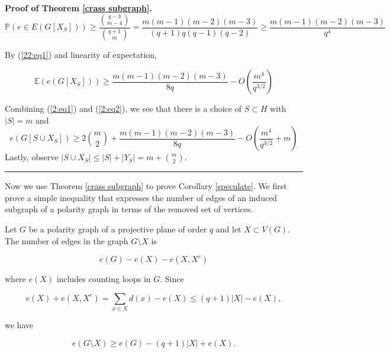 \documentclass[12pt]{article}
\newenvironment{proof}[1][Proof]{\noindent\textbf{#1.} }
{\hfill \ \rule{0.5em}{0.5em}}
\begin{document}
\begin{proof}[Proof of Theorem \ref{crass subgraph}]
    $$ \mathbb{P} ( e \in E (G[  X_S ] ) ) \geq \frac{ \binom{q-3}{m-4} }{ \binom{q+1}{m}} = \frac{ m ( m - 1) ( m - 2)( m - 3) }{ (q + 1) q ( q - 1) ( q- 2) } \geq \frac{ m ( m -1) ( m -2) ( m - 3) }{q^4} $$

    By (\ref{22:eq1}) and linearity of expectation,

    \begin{equation}\label{2:eq2}
        \mathbb{E} ( e (G [ X_S] ) ) \geq \frac{ m ( m - 1)(m-2)(m-3) }{8q} - O \left( \frac{m^4}{q^{3/2}} \right)
    \end{equation}

    Combining (\ref{2:eq1}) and (\ref{2:eq2}), we see that there is a choice of $S \subset H$ with $|S| = m$ and
    $$ e ( G[ S \cup X_S ] ) \geq 2 \binom{ m }{2} + \frac{ m ( m - 1)(m-2)(m-3) }{8q} - O \left( \frac{m^4}{q^{3/2}}+m \right) $$
    Lastly, observe $|S \cup X_S| \leq |S| + |Y_S| = m + \binom{m}{2}$.
\end{proof}

Now we use Theorem \ref{crass subgraph} to prove Corollary \ref{speculate}.  We first prove a simple inequality that
expresses the number of edges of an induced subgraph of a polarity graph in terms of the removed set of vertices.

Let $G$ be a polarity graph of a projective plane of order $q$ and let $X\subset V(G)$.
The number of edges in the graph $G \setminus X$ is

$$ e(G) - e(X) - e(X, X^c) $$

where $e(X)$ includes counting loops in $G$. Since

$$ e(X) + e(X, X^c) = \sum_{x\in X} d(x) - e(X) \leq (q+1)|X| - e(X), $$

we have

\begin{equation}\label{2:eq3}
    e(G \setminus X ) \geq e(G) - (q + 1) |X| + e(X).
\end{equation}
\end{document}
